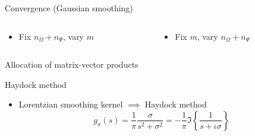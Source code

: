 \documentclass[aspectratio=169, 12pt]{beamer}
\begin{document}
\begin{frame}{Convergence (Gaussian smoothing)}
    \begin{columns}
        \begin{column}{0.5\textwidth}
            \begin{itemize}
                \item Fix $n_{\Omega} + n_{\Psi}$, vary $m$
            \end{itemize}
            \scalebox{1.0}{}
        \end{column}
        \begin{column}{0.5\textwidth}
            \begin{itemize}
                \item Fix $m$, vary $n_{\Omega} + n_{\Psi}$
            \end{itemize}
            \scalebox{1.0}{}
        \end{column}
    \end{columns}
\end{frame}

\begin{frame}{Allocation of matrix-vector products}
    
\end{frame}

\begin{frame}{Haydock method}
    \begin{itemize}
        \item Lorentzian smoothing kernel $\implies$ Haydock method \cite{lin2016review}
    \begin{equation}
        g_{\sigma}(s) = \frac{1}{\pi} \frac{\sigma}{s^2 + \sigma^2} = -\frac{1}{\pi} \Im\left\{ \frac{1}{s + \iota \sigma} \right\}
    \end{equation}
    \end{itemize}
    \centering
    
\end{frame}
 
\end{document}
